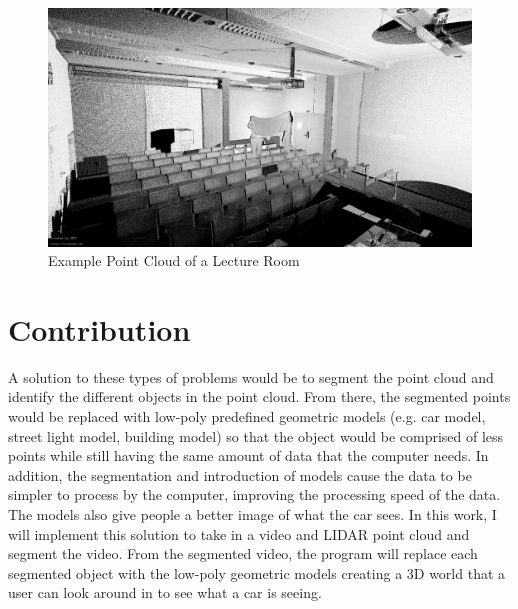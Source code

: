 \begin{figure}
  \includegraphics[width=\linewidth]{figures/lecturehall1.png}
  \caption{Example Point Cloud of a Lecture Room \cite{schauer_2017}}
  \label{fig:pointCloud1}
\end{figure}

\section{Contribution}

\indent A solution to these types of problems would be to segment the point cloud and identify the different objects in the point cloud. From there, the segmented points would be replaced with low-poly predefined geometric models (e.g. car model, street light model, building model) so that the object would be comprised of less points while still having the same amount of data that the computer needs. In addition, the segmentation and introduction of models cause the data to be simpler to process by the computer, improving the processing speed of the data. The models also give people a better image of what the car sees. In this work, I will implement this solution to take in a video and LIDAR point cloud and segment the video. From the segmented video, the program will replace each segmented object with the low-poly geometric models creating a 3D world that a user can look around in to see what a car is seeing.
